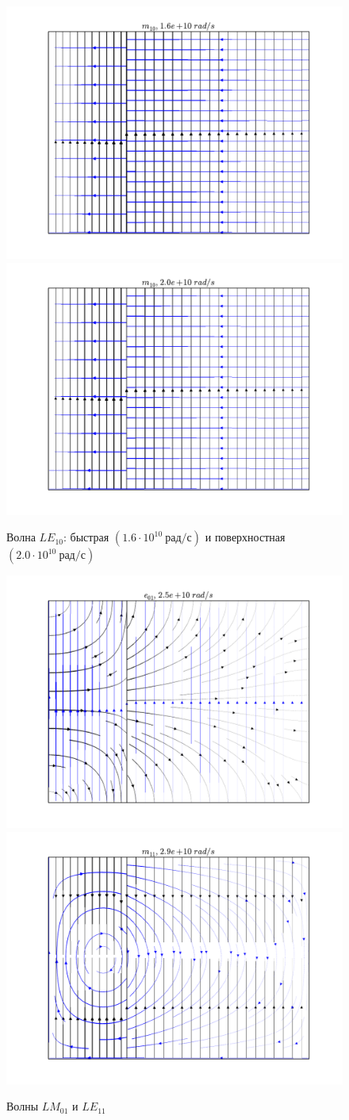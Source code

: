 \begin{figure}[h]
\center
\includegraphics[width=.47\textwidth]{field/field_le_1_0_1,6e+10.png}\hfill
\includegraphics[width=.47\textwidth]{field/field_le_1_0_2,0e+10.png}
\caption{Волна \(LE_{10}\): быстрая \((1.6\cdot10^{10}~\text{рад/с})\) и
поверхностная \((2.0\cdot10^{10}~\text{рад/с})\)}
\end{figure}
\begin{figure}[h]
\center
\includegraphics[width=.47\textwidth]{field/field_lm_0_1_2,5e+10.png}\hfill
\includegraphics[width=.47\textwidth]{field/field_le_1_1_2,9e+10.png}
\caption{Волны \(LM_{01}\) и \(LE_{11}\)}
\end{figure}
